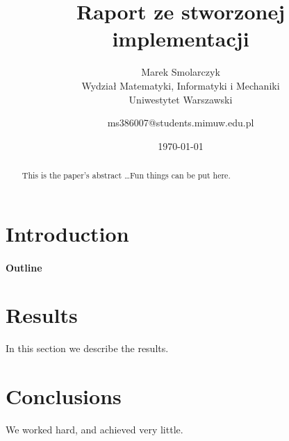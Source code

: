 \documentclass[12pt]{article}
\title{Raport ze stworzonej implementacji}
\author{
        Marek Smolarczyk \\
                Wydział Matematyki, Informatyki i Mechaniki \\
                Uniwestytet Warszawski \\
            \and
        ms386007@students.mimuw.edu.pl
}
\date{\today}
\begin{document}
\maketitle

\begin{abstract}
This is the paper's abstract \ldots Fun things can be put here.
\end{abstract}

\section{Introduction}

\paragraph{Outline}

\section{Results}\label{results}
In this section we describe the results.

\section{Conclusions}\label{conclusions}
We worked hard, and achieved very little.



\end{document}
